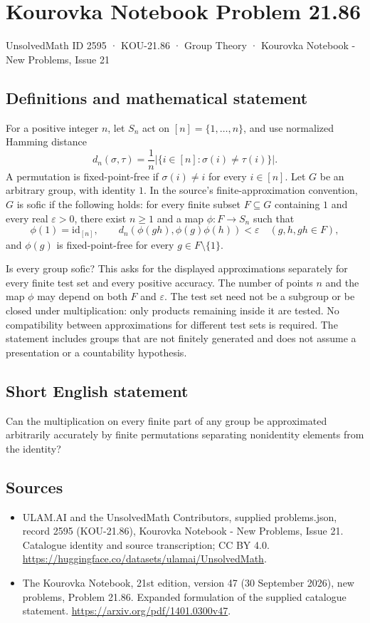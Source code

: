 \documentclass[11pt,a4paper]{article}
\begin{document}
\section*{Kourovka Notebook Problem 21.86}\label{2595}
{\small UnsolvedMath ID 2595 · KOU-21.86 · Group Theory · Kourovka Notebook - New Problems, Issue 21}
\subsection{Definitions and mathematical statement}
For a positive integer $n$, let $S_n$ act on $[n]=\{1,\ldots,n\}$, and use normalized Hamming distance
\[
 d_n(\sigma,\tau)=\frac{1}{n}|\{i\in[n]:\sigma(i)\ne\tau(i)\}|.
\]
A permutation is fixed-point-free if $\sigma(i)\ne i$ for every $i\in[n]$. Let $G$ be an arbitrary group, with identity $1$. In the source's finite-approximation convention, $G$ is sofic if the following holds: for every finite subset $F\subseteq G$ containing $1$ and every real $\varepsilon>0$, there exist $n\ge1$ and a map $\phi:F\to S_n$ such that
\[
 \phi(1)=\mathrm{id}_{[n]},\qquad
 d_n(\phi(gh),\phi(g)\phi(h))<\varepsilon
 \quad(g,h,gh\in F),
\]
and $\phi(g)$ is fixed-point-free for every $g\in F\setminus\{1\}$.

Is every group sofic? This asks for the displayed approximations separately for every finite test set and every positive accuracy. The number of points $n$ and the map $\phi$ may depend on both $F$ and $\varepsilon$. The test set need not be a subgroup or be closed under multiplication: only products remaining inside it are tested. No compatibility between approximations for different test sets is required. The statement includes groups that are not finitely generated and does not assume a presentation or a countability hypothesis.
\subsection{Short English statement}
Can the multiplication on every finite part of any group be approximated arbitrarily accurately by finite permutations separating nonidentity elements from the identity?
\subsection{Sources}
\begin{itemize}
\item[S1] ULAM.AI and the UnsolvedMath Contributors, supplied problems.json, record 2595 (KOU-21.86), Kourovka Notebook - New Problems, Issue 21. Catalogue identity and source transcription; CC BY 4.0.
\url{https://huggingface.co/datasets/ulamai/UnsolvedMath}.
\item[S2] The Kourovka Notebook, 21st edition, version 47 (30 September 2026), new problems, Problem 21.86. Expanded formulation of the supplied catalogue statement.
\url{https://arxiv.org/pdf/1401.0300v47}.
\end{itemize}
\end{document}
